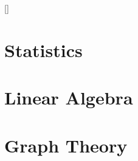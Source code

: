 \titleformat{\chapter}[display]{\large\scshape}{\textcolor{gray75}{appendix \thechapter}}{0pt}{\Huge\bfseries}[\vspace{3cm}]
\renewcommand{\thetheorem}{\Alph{chapter}.\arabic{section}.\arabic{theorem}}

\begin{appendices}
\chapter{Statistics}
\begin{refsection}
  
\printbibliography[heading=subbibliography]
\end{refsection}

\chapter{Linear Algebra}
\begin{refsection}
  
\printbibliography[heading=subbibliography]
\end{refsection}

\chapter{Graph Theory}
\begin{refsection}
  
\printbibliography[heading=subbibliography]
\end{refsection}
\end{appendices}
